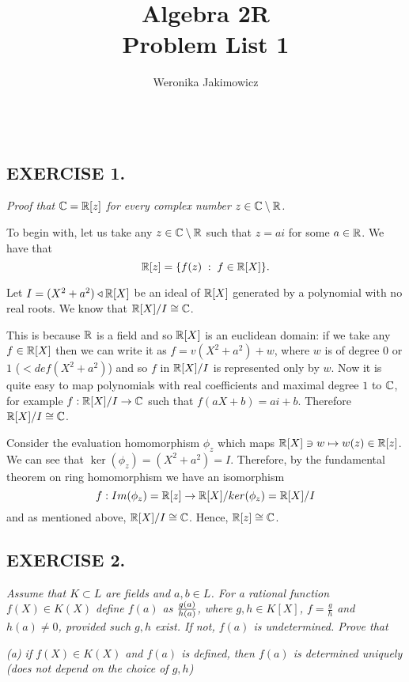 \documentclass{article}
\title{\large Algebra 2R\smallskip\\ \textbf{Problem List 1}}
\author{\normalsize Weronika Jakimowicz}
\date{~~~}
\begin{document}
\maketitle
\thispagestyle{empty}

\subsection*{EXERCISE 1.}
\emph{\color{pink}Proof that $\mathbb{C}=\mathbb{R}[z]$ for every complex number $z\in \mathbb{C}\setminus\mathbb{R}$.}
\smallskip

To begin with, let us take any $z\in\mathbb{C}\setminus\mathbb{R}$ such that $z=ai$ for some $a\in\mathbb{R}$. We have that
$$\mathbb{R}[z]=\{f(z)\;:\;f\in\mathbb{R}[X]\}.$$

Let $I=(X^2+a^2)\triangleleft\mathbb{R}[X]$ be an ideal of $\mathbb{R}[X]$ generated by a polynomial with no real roots. We know that $\mathbb{R}[X]/I\cong \mathbb{C}$. 

This is because $\mathbb{R}$ is a field and so $\mathbb{R}[X]$ is an euclidean domain: if we take any $f\in\mathbb{R}[X]$ then we can write it as $f=v(X^2+a^2)+w$, where $w$ is of degree $0$ or $1$ ($<def(X^2+a^2)$) and so $f$ in $\mathbb{R}[X]/I$ is represented only by $w$. Now it is quite easy to map polynomials with real coefficients and maximal degree $1$ to $\mathbb{C}$, for example $f:\mathbb{R}[X]/I\to\mathbb{C}$ such that $f(aX+b)=ai+b$. Therefore $\mathbb{R}[X]/I\cong \mathbb{C}$.

Consider the evaluation homomorphism $\phi_z$ which maps $\mathbb{R}[X]\ni w\mapsto w(z)\in\mathbb{R}[z]$. We can see that $\ker(\phi_z)=(X^2+a^2)=I$. Therefore, by the fundamental theorem on ring homomorphism we have an isomorphism
$$f:Im(\phi_z)=\mathbb{R}[z]\to \mathbb{R}[X]/ker(\phi_z)=\mathbb{R}[X]/I$$
and as mentioned above, $\mathbb{R}[X]/I\cong\mathbb{C}$. Hence, $\mathbb{R}[z]\cong\mathbb{C}$.

\proofend

\subsection*{EXERCISE 2.}
\emph{\color{pink}Assume that $K\subset L$ are fields and $a,b\in L$. For a rational function $f(X)\in K(X)$ define $f(a)$ as ${g(a)\over h(a)}$, where $g,h\in K[X]$, $f=\frac gh$ and $h(a)\neq 0$, provided such $g,h$ exist. If not, $f(a)$ is undetermined. Prove that}
\smallskip

\emph{\color{pink}(a) if $f(X)\in K(X)$ and $f(a)$ is defined, then $f(a)$ is determined uniquely (does not depend on the choice of $g, h$)}
\smallskip

\end{document}
